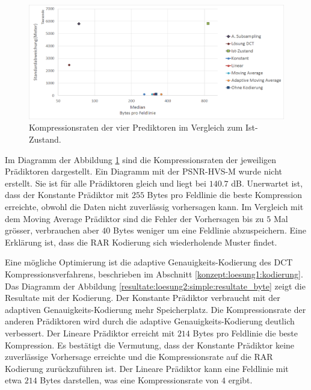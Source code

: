 \begin{figure}[!htbp]
	\center
	\includegraphics[width=1\textwidth,keepaspectratio]{./pictures/resultate/loesung2/variante0/resultate.png}
	\caption{Kompressionsraten der vier Prediktoren im Vergleich zum Ist-Zustand.}
	\label{resultate:loesung2:simple:resultate}
\end{figure}
Im Diagramm der Abbildung \ref{resultate:loesung2:simple:resultate} sind die Kompressionsraten der jeweiligen Prädiktoren dargestellt. Ein Diagramm mit der PSNR-HVS-M wurde nicht erstellt. Sie ist für alle Prädiktoren gleich und liegt bei $140.7$ dB. Unerwartet ist, dass der Konstante Prädiktor mit $255$ Bytes pro Feldlinie die beste Kompression erreichte, obwohl die Daten nicht zuverlässig vorhersagen kann. Im Vergleich mit dem Moving Average Prädiktor sind die Fehler der Vorhersagen 
bis zu $5$ Mal grösser, verbrauchen aber $40$ Bytes weniger um eine Feldlinie abzuspeichern. Eine Erklärung ist, dass die RAR Kodierung sich wiederholende Muster findet.

Eine mögliche Optimierung ist die adaptive Genauigkeits-Kodierung des DCT Kompressionsverfahrens, beschrieben im Abschnitt \ref{konzept:loesung1:kodierung}. Das Diagramm der Abbildung \ref{resultate:loesung2:simple:resultate_byte} zeigt die Resultate mit der Kodierung. Der Konstante Prädiktor verbraucht mit der adaptiven Genauigkeits-Kodierung mehr Speicherplatz. Die Kompressionsrate der anderen Prädiktoren wird durch die adaptive Genauigkeits-Kodierung deutlich verbessert. Der Lineare Prädiktor erreicht mit $214$ Bytes pro Feldlinie die beste Kompression. Es bestätigt die Vermutung, dass der Konstante Prädiktor keine zuverlässige Vorhersage erreichte und die Kompressionsrate auf die RAR Kodierung zurückzuführen ist. Der Lineare Prädiktor kann eine Feldlinie mit etwa $214$ Bytes darstellen, was eine Kompressionsrate von $4$ ergibt.

